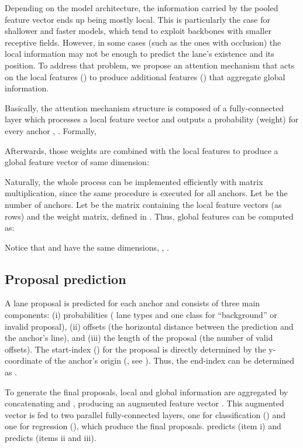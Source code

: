 \documentclass[final]{cvpr}
\begin{document}
Depending on the model architecture, the information carried by the pooled feature vector ends up being mostly local. This is particularly the case for shallower and faster models, which tend to exploit backbones with smaller receptive fields. However, in some cases (such as the ones with occlusion) the local information may not be enough to predict the lane's existence and its position. To address that problem, we propose an attention mechanism that acts on the local features () to produce additional features () that aggregate global information.

Basically, the attention mechanism structure is composed of a fully-connected layer  which processes a local feature vector  and outputs a probability (weight)  for every anchor , . Formally,

Afterwards, those weights are combined with the local features to produce a global feature vector of same dimension:

Naturally, the whole process can be implemented efficiently with matrix multiplication, since the same procedure is executed for all anchors. Let  be the number of anchors. Let  be the matrix containing the local feature vectors (as rows) and  the weight matrix,  defined in . Thus, global features can be computed as:


Notice that  and  have the same dimensions, \ie, . 








\subsection{Proposal prediction}
\label{sec:proposal_prediction}
A lane proposal is predicted for each anchor and consists of three main components: (i)  probabilities ( lane types and one class for ``background'' or invalid proposal), (ii)  offsets (the horizontal distance between the prediction and the anchor's line), and (iii) the length  of the proposal (the number of valid offsets). The start-index () for the proposal is directly determined by the y-coordinate of the anchor's origin (, see ). Thus, the end-index can be determined as .

To generate the final proposals, local and global information are aggregated by concatenating  and , producing an augmented feature vector . This augmented vector is fed to two parallel fully-connected layers, one for classification () and one for regression (), which produce the final proposals.
 predicts  (item i) and  predicts  (items ii and iii).
\end{document}
